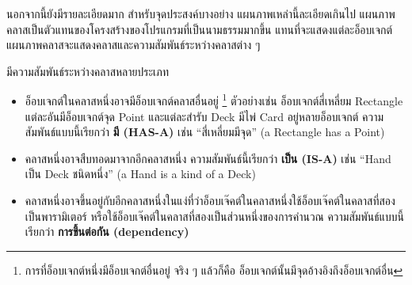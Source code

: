 นอกจากนี้ยังมีรายละเอียดมาก
สำหรับจุดประสงค์บางอย่าง แผนภาพเหล่านี้ละเอียดเกินไป 
แผนภาพคลาสเป็นตัวแทนของโครงสร้างของโปรแกรมที่เป็นนามธรรมมากขึ้น 
แทนที่จะแสดงแต่ละอ็อบเจกต์ แผนภาพคลาสจะแสดงคลาสและความสัมพันธ์ระหว่างคลาสต่าง ๆ


มีความสัมพันธ์ระหว่างคลาสหลายประเภท

\begin{itemize}


\item อ็อบเจกต์ในคลาสหนึ่งอาจมีอ็อบเจกต์คลาสอื่นอยู่%
\footnote{การที่อ็อบเจกต์หนึ่งมีอ็อบเจกต์อื่นอยู่ จริง ๆ แล้วก็คือ อ็อบเจกต์นั้นมีจุดอ้างอิงถึงอ็อบเจกต์อื่น}
ตัวอย่างเช่น อ็อบเจกต์สี่เหลี่ยม Rectangle แต่ละอันมีอ็อบเจกต์จุด Point 
และแต่ละสำรับ Deck มีไพ่ Card อยู่หลายอ็อบเจกต์ 
ความสัมพันธ์แบบนี้เรียกว่า {\bf มี (HAS-A)} เช่น ``สี่เหลี่ยมมีจุด'' (a Rectangle has a Point)


\item คลาสหนึ่งอาจสืบทอดมาจากอีกคลาสหนึ่ง ความสัมพันธ์นี้เรียกว่า {\bf เป็น (IS-A)} เช่น ``Hand เป็น Deck ชนิดหนึ่ง'' (a Hand is a kind of a Deck)


\item คลาสหนึ่งอาจขึ้นอยู่กับอีกคลาสหนึ่งในแง่ที่ว่าอ็อบเจ๊คต์ในคลาสหนึ่งใช้อ็อบเจ๊คต์ในคลาสที่สองเป็นพารามิเตอร์ 
หรือใช้อ็อบเจ๊คต์ในคลาสที่สองเป็นส่วนหนึ่งของการคำนวณ 
ความสัมพันธ์แบบนี้เรียกว่า {\bf การขึ้นต่อกัน (dependency)}

\end{itemize}


